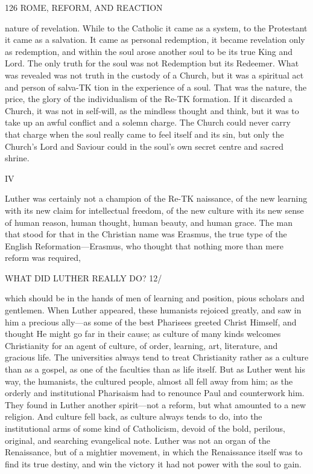 \documentclass[12pt,a5paper,twoside]{book}
\begin{document}
126 ROME, REFORM, AND REACTION 

nature of revelation. While to the Catholic it came 
as a system, to the Protestant it came as a salvation. 
It came as personal redemption, it became revelation 
only as redemption, and within the soul arose another 
soul to be its true King and Lord. The only truth 
for the soul was not Redemption but its Redeemer. 
What was revealed was not truth in the custody of a 
Church, but it was a spiritual act and person of salva-TK
tion in the experience of a soul. That was the nature, 
the price, the glory of the individualism of the Re-TK
formation. If it discarded a Church, it was not in 
self-will, as the mindless thought and think, but it 
was to take up an awful conflict and a solemn charge. 
The Church could never carry that charge when the 
soul really came to feel itself and its sin, but only 
the Church's Lord and Saviour could in the soul's 
own secret centre and sacred shrine. 

IV 

Luther was certainly not a champion of the Re-TK
naissance, of the new learning with its new claim for 
intellectual freedom, of the new culture with its new 
sense of human reason, human thought, human 
beauty, and human grace. The man that stood for 
that in the Christian name was Erasmus, the true type 
of the English Reformation---Erasmus, who thought 
that nothing more than mere reform was required, 



WHAT DID LUTHER REALLY DO? 12/ 

which should be in the hands of men of learning and 
position, pious scholars and gentlemen. When Luther 
appeared, these humanists rejoiced greatly, and saw in 
him a precious ally---as some of the best Pharisees 
greeted Christ Himself, and thought He might go far 
in their cause; as culture of many kinds welcomes 
Christianity for an agent of culture, of order, learning, 
art, literature, and gracious life. The universities 
always tend to treat Christianity rather as a culture 
than as a gospel, as one of the faculties than as life 
itself. But as Luther went his way, the humanists, 
the cultured people, almost all fell away from him; 
as the orderly and institutional Pharisaism had to 
renounce Paul and counterwork him. They found 
in Luther another spirit---not a reform, but what 
amounted to a new religion. And culture fell back, 
as culture always tends to do, into the institutional 
arms of some kind of Catholicism, devoid of the bold, 
perilous, original, and searching evangelical note. 
Luther was not an organ of the Renaissance, but of 
a mightier movement, in which the Renaissance itself 
was to find its true destiny, and win the victory it 
had not power with the soul to gain. 
\end{document}
